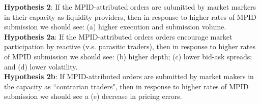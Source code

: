 \documentclass{article}
\begin{document}
\parbox{\textwidth}{
\noindent \textbf{Hypothesis 2}: If the MPID-attributed orders are submitted by market markers in their capacity as liquidity providers, then in response to higher rates of MPID submission we should see: (a) higher execution and submission volume. \\
    \textbf{Hypothesis 2a}: If the MPID-attributed orders orders encourage market participation by reactive (v.s. parasitic traders), then in response to higher rates of MPID submission we should see: (b) higher depth; (c) lower bid-ask spreads; and (d) lower volatility. \\
\noindent \textbf{Hypothesis 2b}: If MPID-attributed orders are submitted by market makers in the capacity as ``contrarian traders", then in response to higher rates of MPID submission we should see a (e) decrease in pricing errors.
}


\end{document}
